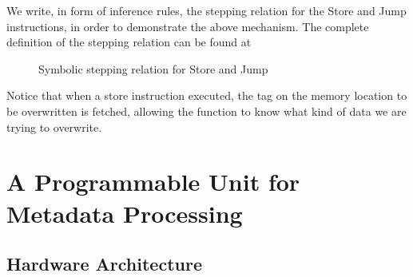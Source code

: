 We write, in form of inference rules, the stepping relation for the Store and 
Jump instructions, in order to demonstrate the above mechanism. The complete
definition of the stepping relation can be found at 

\begin{figure}[!htpb]
\bigskip

\caption{Symbolic stepping relation for Store and Jump}
\end{figure}

Notice that when a store instruction executed, the tag on the memory location to
be overwritten is fetched, allowing the \TRANSFER function to know what kind of
data we are trying to overwrite.

\section{A Programmable Unit for Metadata Processing}\label{sec:pump}


\subsection{Hardware Architecture}

